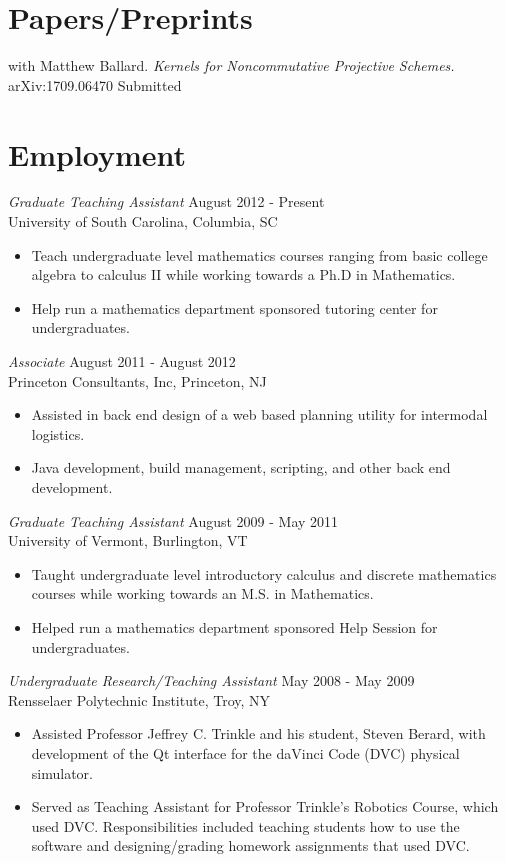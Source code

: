 \documentclass{article}
\begin{document}
  \section*{Papers/Preprints}
  with Matthew Ballard.  \textsl{Kernels for Noncommutative Projective Schemes.} 
  arXiv:1709.06470 \hfill Submitted
  
  \section*{Employment}
  \textsl{Graduate Teaching Assistant} \hfill August 2012 - Present \\
  University of South Carolina, Columbia, SC
  \begin{itemize}  \itemsep -2pt %
  \item
    Teach undergraduate level mathematics courses ranging from basic college algebra to calculus II while working towards a Ph.D in Mathematics.
  \item 
    Help run a mathematics department sponsored tutoring center for undergraduates.
  \end{itemize}

  \noindent\textsl{Associate} \hfill August 2011 - August 2012\\
  Princeton Consultants, Inc, Princeton, NJ
  \begin{itemize}\itemsep -2pt
  \item
    Assisted in back end design of a web based planning utility for intermodal logistics.
  \item
    Java development, build management, scripting, and other back end development.
  \end{itemize}
  
  \noindent\textsl{Graduate Teaching Assistant} \hfill August 2009 - May 2011 \\
  University of Vermont, Burlington, VT
  \begin{itemize}  \itemsep -2pt %
  \item
    Taught undergraduate level introductory calculus and discrete mathematics courses while working towards an M.S. in Mathematics.
  \item 
    Helped run a mathematics department sponsored Help Session for undergraduates.
  \end{itemize}

  \noindent\textsl{Undergraduate Research/Teaching Assistant} \hfill May 2008 - May 2009 \\
  Rensselaer Polytechnic Institute, Troy, NY
  \begin{itemize}  \itemsep -2pt %
  \item Assisted Professor Jeffrey C. Trinkle and his student, Steven Berard, with development of the Qt interface for the daVinci Code (DVC) physical simulator.
  \item Served as Teaching Assistant for Professor Trinkle's Robotics Course, which used DVC.
    Responsibilities included teaching students how to use the software and designing/grading homework assignments that used DVC.
  \end{itemize}
\end{document}
